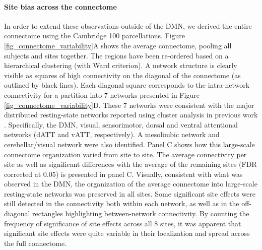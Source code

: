 \documentclass[authoryear]{elsarticle}
\begin{document}
\paragraph{Site bias across the connectome} In order to extend these observations outside of the DMN, we derived the entire connectome using the Cambridge 100 parcellations. Figure \ref{fig_connectome_variability}A shows the average connectome, pooling all subjects and sites together. The regions have been re-ordered based on a hierarchical clustering (with Ward criterion). A network structure is clearly visible as squares of high connectivity on the diagonal of the connectome (as outlined by black lines). Each diagonal square corresponds to the intra-network connectivity for a partition into 7 networks presented in Figure \ref{fig_connectome_variability}D. These 7 networks were consistent with the major distributed resting-state networks reported using cluster analysis in previous work \citep[e.g.,]{Heuvel2008, Bellec2010, Yeo2011, Power2011}. Specifically, the DMN, visual, sensorimotor, dorsal and ventral attentional networks (dATT and vATT, respectively). A mesolimbic network and cerebellar/visual network were also identified. Panel C shows how this large-scale connectome organization varied from site to site. The average connectivity per site as well as significant differences with the average of the remaining sites (FDR corrected at 0.05) is presented in panel C. Visually, consistent with what was observed in the DMN, the organization of the average connectome into large-scale resting-state networks was preserved in all sites. Some significant site effects were still detected in the connectivity both within each network, as well as in the off-diagonal rectangles highlighting between-network connectivity. By counting the frequency of significance of site effects across all 8 sites, it was apparent that significant site effects were quite variable in their localization and spread across the full connectome. 
\end{document}
